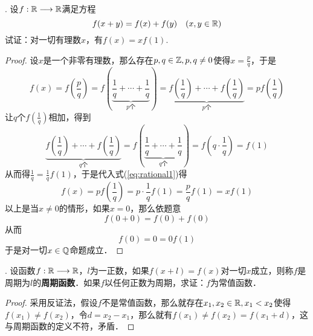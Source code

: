 . 设$f: \mathbb{R} \longrightarrow \mathbb{R}$满足方程
\begin{equation}
    f(x+y)=f(x)+f(y) \quad (x,y \in \mathbb{R})
\end{equation}
试证：对一切有理数$x$，有$f(x) = xf(1)$.

\begin{proof}
设$x$是一个非零有理数，那么存在$p, q \in \mathbb{Z}, p, q \neq 0$使得$x = \displaystyle\frac{p}{q}$，于是
\begin{equation}
    f(x) = f(\displaystyle\frac{p}{q}) = f(\underbrace{\displaystyle\frac{1}{q}+\cdots+\displaystyle\frac{1}{q}}_{p\text{个}}) = \underbrace{f(\displaystyle\frac{1}{q})+\cdots+f(\displaystyle\frac{1}{q})}_{p\text{个}} = p f(\displaystyle\frac{1}{q})
    \label{eq:rational1}
\end{equation}
让$q$个$f(\displaystyle\frac{1}{q})$相加，得到
\begin{equation}
    \underbrace{f(\displaystyle\frac{1}{q})+\cdots+f(\displaystyle\frac{1}{q})}_{q\text{个}} = f(\underbrace{\displaystyle\frac{1}{q}+\cdots+\displaystyle\frac{1}{q}}_{q\text{个}})=f(q \cdot \displaystyle\frac{1}{q}) = f(1)
\end{equation}
从而得$\displaystyle\frac{1}{q}=\displaystyle\frac{1}{q}f(1)$，于是代入式(\ref{eq:rational1})得
\begin{equation}
    f(x) = p f(\displaystyle\frac{1}{q}) = p \cdot \displaystyle\frac{1}{q}f(1) = \displaystyle\frac{p}{q}f(1)=xf(1)
\end{equation}
以上是当$x \neq 0$的情形，如果$x=0$，那么依题意
\begin{equation}
    f(0 + 0) = f(0) + f(0)
\end{equation}
从而
\begin{equation}
    f(0) = 0 = 0 f(1)
\end{equation}
于是对一切$x \in \mathbb{Q}$命题成立．
\end{proof}

. 设函数$f: \mathbb{R} \longrightarrow \mathbb{R}$，$l$为一正数，如果$f(x+l)=f(x)$对一切$x$成立，则称$f$是周期为$l$的{\bfseries{周期函数}}．如果$f$以任何正数为周期，求证：$f$为常值函数．
\begin{proof}
采用反证法，假设$f$不是常值函数，那么就存在$x_1, x_2 \in \mathbb{R}, x_1 < x_2$使得$f(x_1) \neq f(x_2)$，令$d = x_2 - x_1$，那么就有$f(x_1)\neq f(x_2)=f(x_1 + d)$，这与周期函数的定义不符，矛盾．
\end{proof}

